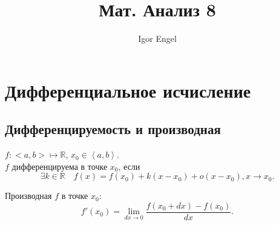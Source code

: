 \documentclass[11pt, oneside]{article}   	%
\title{Мат. Анализ 8}
\author{Igor Engel}
\date{}
\begin{document}
\maketitle
\section{Дифференциальное исчисление}
    \subsection{Дифференцируемость и производная}
        \begin{definition}
            $f: <a,b> \mapsto \mathbb{R}$, $x_0\in \left<a, b\right>$.\\
            $f$ дифференцируема в точке $x_0$, если 
            \[ \exists{k\in \mathbb{R}}\quad f(x) = f(x_0) + k(x-x_0) + o(x-x_0), x \to x_0 .\] 
        \end{definition}
        \begin{definition}
            Производная $f$ в точке $x_0$:
            \[ f'(x_0) = \lim\limits_{dx \to 0} \frac{f(x_0+dx)-f(x_0)}{dx}  .\] 
        \end{definition}
\end{document}
